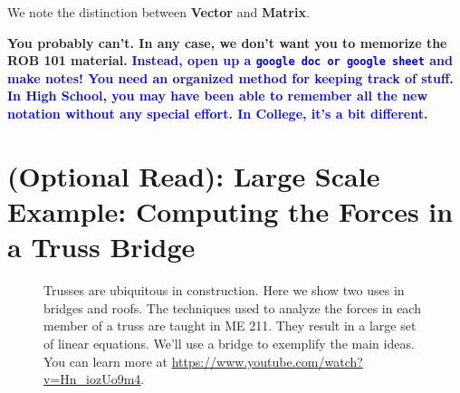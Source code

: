 \begin{itemize}
\begin{tcolorbox}
We note the distinction between \textbf{Vector} and \textbf{Matrix}.
\end{tcolorbox}
 \end{itemize}
 \vspace*{.5cm}
\begin{tcolorbox}[sharp corners, colback=green!30, colframe=green!80!blue, title=\textcolor{red}{\bf {\Large Help!} {\Huge Help!} } \textbf{\huge How am I supposed to remember all of this?}]
 
\textbf{\huge You probably can't. In any case, we don't want you to memorize the ROB 101 material.}  \textcolor{blue}{\huge \bf Instead, open up a \texttt{google doc or google sheet} and make notes! You need an organized method for keeping track of stuff. In High School, you may have been able to remember all the new notation without any special effort. In College, it's a bit different.} 
 
 \end{tcolorbox}

\newpage

\section{(Optional Read): Large Scale Example: Computing the Forces in a Truss Bridge}


\begin{figure}[thb!]%
\centering
{}%
\hspace{5pt}%
%
    \caption[]{Trusses are ubiquitous in construction. Here we show two uses in bridges and roofs. The techniques used to analyze the forces in each member of a truss are taught in ME 211. They result in a large set of linear equations. We'll use a bridge to exemplify the main ideas. You can learn more at \url{https://www.youtube.com/watch?v=Hn_iozUo9m4}.}
    \label{fig:TrussStructures}
\end{figure}

